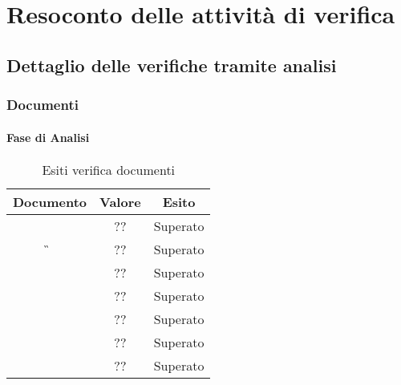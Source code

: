\newpage
\section{Resoconto delle attività di verifica}

	\subsection{Dettaglio delle verifiche tramite analisi}
	
	\subsubsection{Documenti}
	
	\paragraph{Fase di Analisi}
	
		\begin{table}[H]
			\begin{center}
				\begin{tabular}{|c|c|c|}
					\hline
					\textbf{Documento}&	{\textbf{Valore}} & \textbf{Esito} \\
					\hline
					\AdR		&	??	&	Superato	\\
					\hline
					\G			&	??	&	Superato	\\
					\hline
					\NdP		&	??	&	Superato	\\
					\hline
					\PdP 		&	??	&	Superato 	\\
					\hline
					\PdQ 		&	??	&	Superato	\\
					\hline
					\SdF		& 	??	&	Superato	\\
					\hline
					\LdP 		& 	??	&	Superato	\\
					\hline
				\end{tabular}
			\end{center}
			\caption{Esiti verifica documenti}
		\end{table}